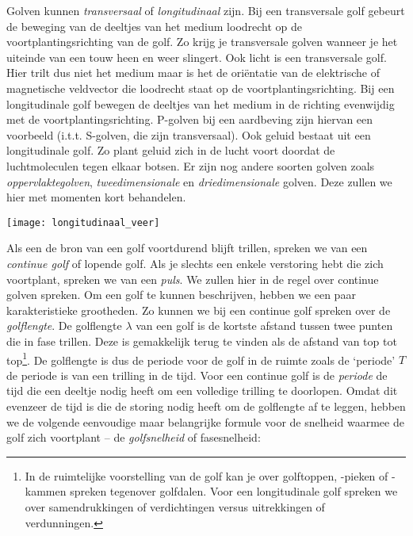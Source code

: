\documentclass{ximera}
\begin{document}
	Golven kunnen \emph{transversaal} of \emph{longitudinaal} zijn. Bij een transversale golf gebeurt de beweging van de deeltjes van het medium loodrecht op de voortplantingsrichting van de golf. Zo krijg je transversale golven wanneer je het uiteinde van een touw heen en weer slingert. Ook licht is een transversale golf. Hier trilt dus niet het medium maar is het de oriëntatie van de elektrische of magnetische veldvector die loodrecht staat op de voortplantingsrichting. Bij een longitudinale golf bewegen de deeltjes van het medium in de richting evenwijdig met de voortplantingsrichting. P-golven bij een aardbeving zijn hiervan een voorbeeld (i.t.t. S-golven, die zijn transversaal). Ook geluid bestaat uit een longitudinale golf. Zo plant geluid zich in de lucht voort doordat de luchtmoleculen tegen elkaar botsen. 
	Er zijn nog andere soorten golven zoals \emph{oppervlaktegolven}, \emph{tweedimensionale} en \emph{driedimensionale} golven. Deze zullen we hier met momenten kort behandelen.
	\begin{image}
	
	\texttt{[image: longitudinaal\_veer]}
	\end{image}
	Als een de bron van een golf voortdurend blijft trillen, spreken we van een \emph{continue golf} of lopende golf. Als je slechts een enkele verstoring hebt die zich voortplant, spreken we van een \emph{puls}. We zullen hier in de regel over continue golven spreken.
	Om een golf te kunnen beschrijven, hebben we een paar karakteristieke grootheden. Zo kunnen we bij een continue golf spreken over de \emph{golflengte}. De golflengte $\lambda$ van een golf is de kortste afstand tussen twee punten die in fase trillen. Deze is gemakkelijk terug te vinden als de afstand van top tot top\footnote{In de ruimtelijke voorstelling van de golf kan je over golftoppen, -pieken of -kammen spreken tegenover golfdalen. Voor een longitudinale golf spreken we over samendrukkingen of verdichtingen versus uitrekkingen of verdunningen.}. De golflengte is dus de periode voor de golf in de ruimte zoals de `periode' $T$ de periode is van een trilling in de tijd. Voor een continue golf is de \emph{periode} de tijd die een deeltje nodig heeft om een volledige trilling te doorlopen. Omdat dit evenzeer de tijd is die de storing nodig heeft om de golflengte af te leggen, hebben we de volgende eenvoudige maar belangrijke formule voor de snelheid waarmee de golf zich voortplant -- de \emph{golfsnelheid} of fasesnelheid:
\end{document}
